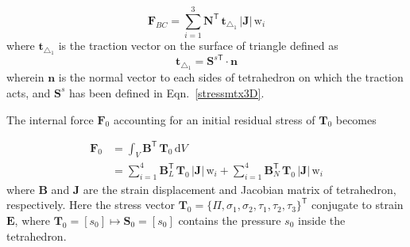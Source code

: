 \begin{equation}
\mathbf{F}_{BC} = \sum_{i=1}^{3} \mathbf{N}^{\mathsf{T}} \, \mathbf{t}_{\triangle_{1}} \,|\mathbf{J}| \, \mathrm{w}_i 
\end{equation}
where $\mathbf{t}_{\triangle_{1}}$ is the traction vector on the surface of triangle defined as
\begin{equation}
	\mathbf{t}_{\triangle_{1}} = \mathbf{S}^{s\mathsf{T}} \cdot \mathbf{n} 
\end{equation}
wherein $ \mathbf{n} $ is the normal vector to each sides of tetrahedron on which the traction acts, and $ \mathbf{S}^s $ has been defined in Eqn.~\eqref{stressmtx3D}.

The internal force $\boldsymbol{F}_0$ accounting for an initial residual stress of $\boldsymbol{T}_0$ becomes

\begin{subequations}
	\begin{align}
		\boldsymbol{F}_0 & = \int_{V} \mathbf{B}^{\mathsf{T}} \,	\boldsymbol{T}_0 \, 
		\mathrm{d} V \\
		& =  \sum_{i=1}^{4} \mathbf{B}_L^{\mathsf{T}} \,	\boldsymbol{T}_0 \, | \mathbf{J} | \, \mathrm{w}_i +  \sum_{i=1}^{4} \mathbf{B}_N^{\mathsf{T}} \,	\boldsymbol{T}_0 \, | \mathbf{J} | \, \mathrm{w}_i
	\end{align}
\end{subequations}
where $\mathbf{B}$ and $\mathbf{J}$ are the strain displacement and Jacobian matrix of tetrahedron, respectively. 
Here the stress vector $\boldsymbol{T}_0 = \{ \Pi, \sigma_1, \sigma_2, \tau_1, \tau_2, \tau_3 \}^{\mathsf{T}}$ conjugate to strain $\boldsymbol{E}$, where $\mathbf{T}_0 = [s_0] \mapsto \mathbf{S}_0 = [s_0]$  contains the pressure $s_0$ inside the tetrahedron.

